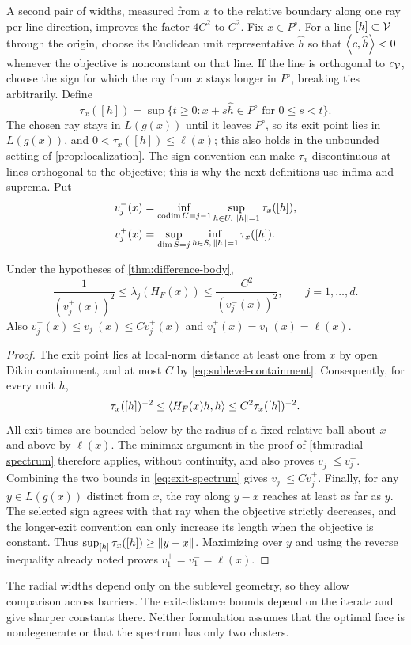 A second pair of widths, measured from $x$ to the relative boundary
along one ray per line direction, improves the factor $4C^2$ to $C^2$.
Fix
$x\in P^\circ$. For a line $[h]\subset\mathcal V$ through the origin, choose
its Euclidean unit representative $\widehat h$ so that $\left\langle c,\widehat h\right\rangle<0$ whenever
the objective is nonconstant on that line. If the line is orthogonal to
$c_{\mathcal V}$, choose the sign for which the ray from $x$ stays longer in
$P^\circ$, breaking ties arbitrarily. Define
\begin{equation}
 \tau_x([h])=\sup\{t\geq0:x+s\widehat h\in P^\circ
                                  \text{ for }0\leq s<t\}.
 \label{eq:directed-exit}
\end{equation}
The chosen ray stays in $L(g(x))$ until it leaves $P^\circ$, so its exit
point lies in $L(g(x))$, and $0<\tau_x([h])\leq\ell(x)$; this also
holds in the unbounded setting of \cref{prop:localization}. The sign
convention can make $\tau_x$ discontinuous at lines orthogonal to the
objective; this is why the next definitions use infima and suprema. Put
\begin{align}
 v_j^-(x)&=\inf_{\operatorname{codim}U=j-1}
            \sup_{h\in U,\,\left\lVert h\right\rVert=1}\tau_x([h]),\label{eq:exit-width-minus}\\
 v_j^+(x)&=\sup_{\dim S=j}
            \inf_{h\in S,\,\left\lVert h\right\rVert=1}\tau_x([h]).\label{eq:exit-width-plus}
\end{align}

\begin{corollary}
\label{cor:exit-spectrum}
Under the hypotheses of \cref{thm:difference-body},
\begin{equation}
 \frac1{(v_j^+(x))^2}\leq\lambda_j(H_F(x))
         \leq\frac{C^2}{(v_j^-(x))^2},\qquad j=1,\ldots,d.
 \label{eq:exit-spectrum}
\end{equation}
Also $v_j^+(x)\leq v_j^-(x)\leq Cv_j^+(x)$ and
$v_1^+(x)=v_1^-(x)=\ell(x)$.
\end{corollary}

\begin{proof}
The exit point lies at local-norm distance at least one from $x$ by
open Dikin containment, and at most $C$ by
\eqref{eq:sublevel-containment}.
Consequently, for every unit $h$,
\[
 \tau_x([h])^{-2}\leq\left\langle H_F(x)h,h\right\rangle
                      \leq C^2\tau_x([h])^{-2}.
\]
All exit times are bounded below by the radius of a fixed relative ball
about $x$ and above by $\ell(x)$. The minimax argument in the proof of
\cref{thm:radial-spectrum} therefore applies, without continuity, and
also proves $v_j^+\leq v_j^-$. Combining the two bounds in
\eqref{eq:exit-spectrum} gives $v_j^-\leq Cv_j^+$.
Finally, for any $y\in L(g(x))$ distinct
from $x$, the ray along $y-x$ reaches at least as far as $y$. The selected
sign agrees with that ray when the objective strictly decreases, and
the longer-exit convention can only increase its length when the
objective is constant. Thus
$\sup_{[h]}\tau_x([h])\geq\left\lVert y-x\right\rVert$. Maximizing over $y$ and using
the reverse inequality already noted proves
$v_1^+=v_1^-=\ell(x)$.
\end{proof}

The radial widths depend only on the sublevel geometry, so they allow
comparison across barriers. The exit-distance bounds depend on the
iterate and give sharper constants there. Neither
formulation assumes that the optimal face is nondegenerate or that the
spectrum has only two clusters.
